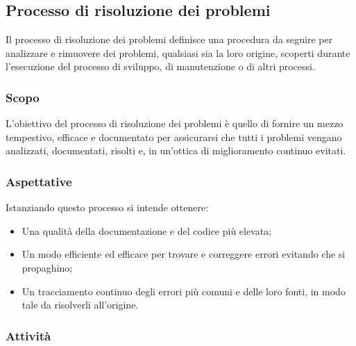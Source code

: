 \subsection{Processo di risoluzione dei problemi}

	Il processo di risoluzione dei problemi definisce una procedura da seguire per analizzare e rimuovere dei problemi, qualsiasi sia la loro origine, scoperti durante l'esecuzione del processo di sviluppo, di manutenzione o di altri processi.

	\subsubsection{Scopo}
		L'obiettivo del processo di risoluzione dei problemi è quello di fornire un mezzo tempestivo, efficace e documentato per assicurarsi che tutti i problemi vengano analizzati, documentati, risolti e, in un'ottica di miglioramento continuo evitati.

	\subsubsection{Aspettative}
		Istanziando questo processo si intende ottenere:
		\begin{itemize}
		 	\item Una qualità della documentazione e del codice più elevata;
		 	\item Un modo efficiente ed efficace per trovare e correggere errori evitando che si propaghino;
		 	\item Un tracciamento continuo degli errori più comuni e delle loro fonti, in modo tale da risolverli all'origine.
		 \end{itemize}
	\subsubsection{Attività}

